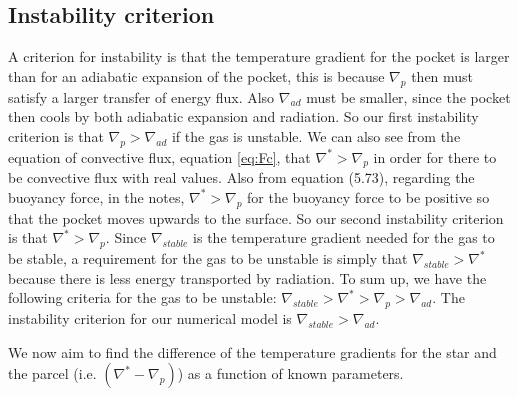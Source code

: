 \documentclass[a4paper,10pt]{article}
\begin{document}
\subsection{Instability criterion} A criterion for instability is that the temperature gradient for the pocket is larger than for an adiabatic expansion of the pocket, this is because $\nabla_p$ then must satisfy a larger transfer of energy flux. Also $\nabla_{ad}$ must be smaller, since the pocket then cools by both adiabatic expansion and radiation. So our first instability criterion is that $\nabla_p > \nabla_{ad}$ if the gas is unstable. We can also see from the equation of convective flux, equation \eqref{eq:Fc}, that $\nabla^* > \nabla_p$ in order for there to be convective flux with real values. Also from equation (5.73), regarding the buoyancy force, in the notes, $\nabla^* > \nabla_p$ for the buoyancy force to be positive so that the pocket moves upwards to the surface. So our second instability criterion is that $\nabla^* > \nabla_p$. Since $\nabla_{stable}$ is the temperature gradient needed for the gas to be stable, a requirement for the gas to be unstable is simply that $\nabla_{stable} > \nabla^*$ because there is less energy transported by radiation. To sum up, we have the following criteria for the gas to be unstable: $\nabla_{stable} > \nabla^* > \nabla_p > \nabla_{ad}$. The instability criterion for our numerical model is $\nabla_{stable} > \nabla_{ad}$.


We now aim to find the difference of the temperature gradients for the star and the parcel (i.e. $(\nabla^* - \nabla_p)$) as a function of known parameters.
\end{document}
